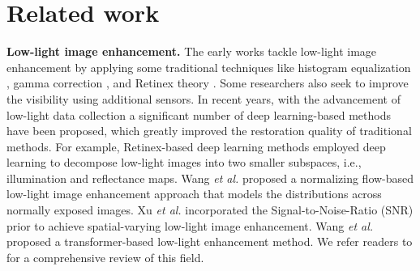 \documentclass{article}
\begin{document}
\section{Related work}
\vspace{-0.2cm}

\textbf{Low-light image enhancement.}
The early works tackle low-light image enhancement by applying some traditional techniques like histogram equalization \cite{pizer1990contrast, stark2000adaptive}, gamma correction \cite{rahman2016adaptive}, and Retinex theory \cite{guo2016lime,ng2011total}. Some researchers also seek to improve the visibility using additional sensors\cite{zhu2023cross,zhu2022learning,wang2023event,wang2023visevent,tang2022revisiting,liu2023low}.
In recent years, with the advancement of low-light data collection \cite{lee2012contrast,guo2016lime,wei2018deep,li2018structure,yang2021sparse}
a significant number of deep learning-based methods \cite{cai2018learning,zhang2019kindling,jiang2021enlightengan,xu2020learning,yang2021band,yang2021sparse,zhao2021deep,guo2020zero,moran2020deeplpf,zheng2021adaptive,wang2022low,xu2022snr,wang2023ultra} have been proposed, which greatly improved the restoration quality of traditional methods. For example,
Retinex-based deep learning methods \cite{wei2018deep,zhang2019kindling,zhang2021beyond,wu2022uretinex} employed deep learning to decompose low-light images into two smaller subspaces, i.e., illumination and reflectance maps.
Wang \emph{et al.} \cite{wang2022low} proposed a normalizing flow-based low-light image enhancement approach that models the distributions across normally exposed images.
Xu \emph{et al.} \cite{xu2022snr} incorporated the Signal-to-Noise-Ratio (SNR) prior to achieve spatial-varying low-light image enhancement.
Wang \emph{et al.} \cite{wang2023ultra} proposed a transformer-based low-light enhancement method.
We refer readers to \cite{li2021low} for a comprehensive review of this field.
\end{document}

